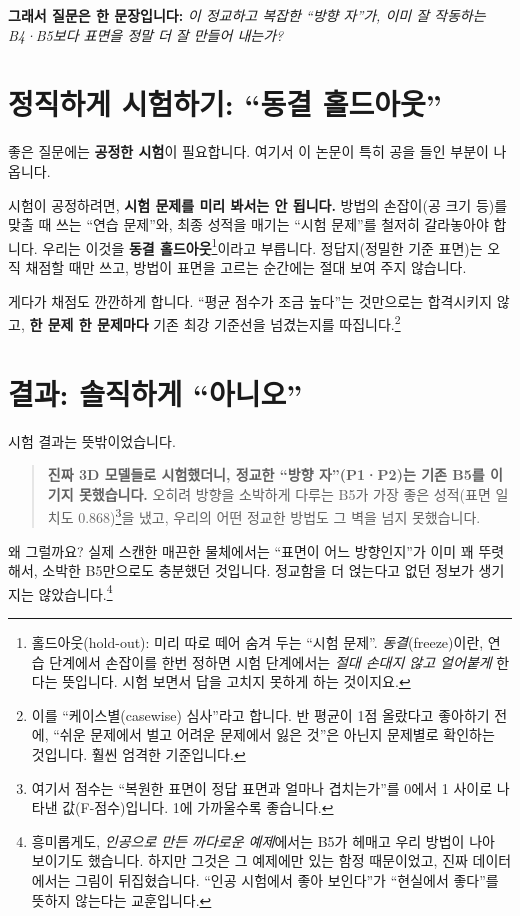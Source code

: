 \documentclass[11pt]{article}
\begin{document}
\noindent\textbf{그래서 질문은 한 문장입니다:}
\emph{이 정교하고 복잡한 ``방향 자''가, 이미 잘 작동하는 B4·B5보다 표면을 정말 더 잘
만들어 내는가?}

\section{정직하게 시험하기: ``동결 홀드아웃''}

좋은 질문에는 \textbf{공정한 시험}이 필요합니다. 여기서 이 논문이 특히 공을 들인
부분이 나옵니다.

시험이 공정하려면, \textbf{시험 문제를 미리 봐서는 안 됩니다.} 방법의 손잡이(공 크기 등)를
맞출 때 쓰는 ``연습 문제''와, 최종 성적을 매기는 ``시험 문제''를 철저히 갈라놓아야
합니다. 우리는 이것을 \textbf{동결 홀드아웃}\footnote{홀드아웃(hold-out): 미리 따로 떼어
숨겨 두는 ``시험 문제''. \emph{동결}(freeze)이란, 연습 단계에서 손잡이를 한번 정하면
시험 단계에서는 \emph{절대 손대지 않고 얼어붙게} 한다는 뜻입니다. 시험 보면서 답을
고치지 못하게 하는 것이지요.}이라고 부릅니다. 정답지(정밀한 기준 표면)는 오직 채점할
때만 쓰고, 방법이 표면을 고르는 순간에는 절대 보여 주지 않습니다.

게다가 채점도 깐깐하게 합니다. ``평균 점수가 조금 높다''는 것만으로는 합격시키지 않고,
\textbf{한 문제 한 문제마다} 기존 최강 기준선을 넘겼는지를 따집니다.\footnote{이를
``케이스별(casewise) 심사''라고 합니다. 반 평균이 1점 올랐다고 좋아하기 전에, ``쉬운
문제에서 벌고 어려운 문제에서 잃은 것''은 아닌지 문제별로 확인하는 것입니다. 훨씬
엄격한 기준입니다.}

\section{결과: 솔직하게 ``아니오''}

시험 결과는 뜻밖이었습니다.

\begin{quote}
\textbf{진짜 3D 모델들로 시험했더니, 정교한 ``방향 자''(P1·P2)는 기존 B5를 이기지
못했습니다.} 오히려 방향을 소박하게 다루는 B5가 가장 좋은 성적(표면 일치도
0.868)\footnote{여기서 점수는 ``복원한 표면이 정답 표면과 얼마나 겹치는가''를 0에서 1
사이로 나타낸 값(F-점수)입니다. 1에 가까울수록 좋습니다.}을 냈고, 우리의 어떤 정교한
방법도 그 벽을 넘지 못했습니다.
\end{quote}

왜 그럴까요? 실제 스캔한 매끈한 물체에서는 ``표면이 어느 방향인지''가 이미 꽤 뚜렷해서,
소박한 B5만으로도 충분했던 것입니다. 정교함을 더 얹는다고 없던 정보가 생기지는
않았습니다.\footnote{흥미롭게도, \emph{인공으로 만든 까다로운 예제}에서는 B5가 헤매고
우리 방법이 나아 보이기도 했습니다. 하지만 그것은 그 예제에만 있는 함정 때문이었고,
진짜 데이터에서는 그림이 뒤집혔습니다. ``인공 시험에서 좋아 보인다''가 ``현실에서
좋다''를 뜻하지 않는다는 교훈입니다.}
\end{document}
